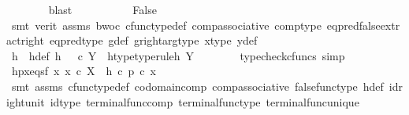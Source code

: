 \begin{isabellebody}
\ \ \ \ \ \ \isamarkupfalse%
\ blast\isanewline
\ \ \ \ \isanewline
\ \ \ \ \isamarkupfalse%
\ False\isanewline
\ \ \ \ \ \ \isamarkupfalse%
\ {\isacharparenleft}{\kern0pt}smt\ {\isacharparenleft}{\kern0pt}verit{\isacharparenright}{\kern0pt}\ assms{\isacharparenleft}{\kern0pt}{}{\isacharparenright}{\kern0pt}\ bwoc\ cfunc{\isacharunderscore}{\kern0pt}type{\isacharunderscore}{\kern0pt}def\ comp{\isacharunderscore}{\kern0pt}associative\ comp{\isacharunderscore}{\kern0pt}type\ eq{\isacharunderscore}{\kern0pt}pred{\isacharunderscore}{\kern0pt}false{\isacharunderscore}{\kern0pt}extract{\isacharunderscore}{\kern0pt}right\ eq{\isacharunderscore}{\kern0pt}pred{\isacharunderscore}{\kern0pt}type\ g{\isacharunderscore}{\kern0pt}def\ g{\isacharunderscore}{\kern0pt}right{\isacharunderscore}{\kern0pt}arg{\isacharunderscore}{\kern0pt}type\ x{\isacharunderscore}{\kern0pt}type\ y{\isacharunderscore}{\kern0pt}def{\isacharparenright}{\kern0pt}\isanewline
\ \ \isamarkupfalse%
\isanewline
\ \ \isamarkupfalse%
\ h\ \ h{\isacharunderscore}{\kern0pt}def{\isacharcolon}{\kern0pt}\ {\isachardoublequoteopen}h\ {\isacharequal}{\kern0pt}\ {\isasymf}\ {\isasymcirc}\isactrlsub c\ {\isasymbeta}\isactrlbsub Y\isactrlesub {\isachardoublequoteclose}\ \ h{\isacharunderscore}{\kern0pt}type{\isacharbrackleft}{\kern0pt}type{\isacharunderscore}{\kern0pt}rule{\isacharbrackright}{\kern0pt}{\isacharcolon}{\kern0pt}{\isachardoublequoteopen}h{\isacharcolon}{\kern0pt}\ Y\ {\isasymrightarrow}\ {\isasymOmega}{\isachardoublequoteclose}\isanewline
\ \ \ \ \isamarkupfalse%
\ {\isacharparenleft}{\kern0pt}typecheck{\isacharunderscore}{\kern0pt}cfuncs{\isacharcomma}{\kern0pt}\ simp{\isacharparenright}{\kern0pt}\isanewline
\ \ \isamarkupfalse%
\ hpx{\isacharunderscore}{\kern0pt}eqs{\isacharunderscore}{\kern0pt}f{\isacharcolon}{\kern0pt}\ {\isachardoublequoteopen}{\isasymforall}x{\isachardot}{\kern0pt}\ x\ {\isasymin}\isactrlsub c\ X\ {\isasymlongrightarrow}\ h\ {\isasymcirc}\isactrlsub c\ p\ {\isasymcirc}\isactrlsub c\ x\ {\isacharequal}{\kern0pt}\ {\isasymf}{\isachardoublequoteclose}\isanewline
\ \ \ \ \isamarkupfalse%
\ {\isacharparenleft}{\kern0pt}smt\ assms{\isacharparenleft}{\kern0pt}{}{\isacharparenright}{\kern0pt}\ cfunc{\isacharunderscore}{\kern0pt}type{\isacharunderscore}{\kern0pt}def\ codomain{\isacharunderscore}{\kern0pt}comp\ comp{\isacharunderscore}{\kern0pt}associative\ false{\isacharunderscore}{\kern0pt}func{\isacharunderscore}{\kern0pt}type\ h{\isacharunderscore}{\kern0pt}def\ id{\isacharunderscore}{\kern0pt}right{\isacharunderscore}{\kern0pt}unit{}\ id{\isacharunderscore}{\kern0pt}type\ terminal{\isacharunderscore}{\kern0pt}func{\isacharunderscore}{\kern0pt}comp\ terminal{\isacharunderscore}{\kern0pt}func{\isacharunderscore}{\kern0pt}type\ terminal{\isacharunderscore}{\kern0pt}func{\isacharunderscore}{\kern0pt}unique{\isacharparenright}{\kern0pt}\isanewline

\end{isabellebody}
